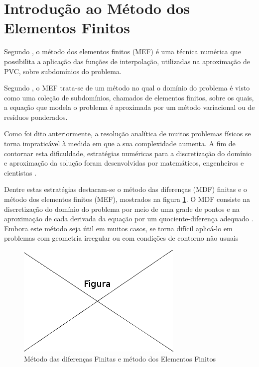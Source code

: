 \documentclass[
    12pt,               %
    openright,          %
    oneside,
    a4paper,            %
    english,            %
    french,             %
    spanish,            %
    brazil              %
    ]{abntex2}
\begin{document}
\section{Introdução ao Método dos Elementos Finitos}
\label{sec:MEF}

Segundo , o método dos elementos finitos (MEF) é uma técnica numérica que possibilita a aplicação das funções de interpolação, utilizadas na aproximação de PVC, sobre subdomínios do problema.

Segundo , o MEF trata-se de um método no qual o domínio do problema é visto como uma coleção de subdomínios, chamados de elementos finitos, sobre os quais, a equação que modela o problema é aproximada por um método variacional ou de resíduos ponderados.



Como foi dito anteriormente, a resolução analítica de muitos problemas físicos se torna impraticável à medida em que a sua  complexidade aumenta. 
A fim de contornar esta dificuldade, estratégias numéricas para a discretização do domínio e aproximação da solução foram desenvolvidas por matemáticos, engenheiros e cientistas \cite[p. 1]{zien}. 

Dentre estas estratégias destacam-se o método das diferenças (MDF) finitas e o método dos elementos finitos (MEF), mostrados na figura \ref{fig:mdfFem}. O MDF consiste na discretização do domínio do problema por meio de uma grade de pontos e na aproximação de cada derivada da equação por um quociente-diferença adequado
\cite[p. 684]{burdenFaires}. Embora este método seja útil em muitos casos, se torna difícil aplicá-lo em problemas com geometria irregular ou com condições de contorno não usuais \cite[p. 4]{huebner}

\begin{figure}[!htb]
\centering
\includegraphics[scale=0.5]{figuras/temp.png}
\caption{Método das diferenças Finitas e método dos Elementos Finitos}
\label{fig:mdfFem}
\end{figure}
\end{document}
